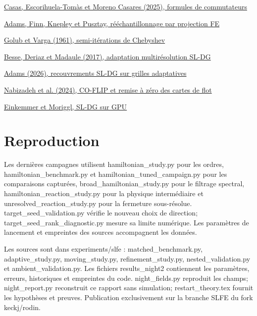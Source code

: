 \documentclass[10pt,a4paper]{article}
\begin{document}
\noindent\href{https://doi.org/10.1007/s11128-025-04659-z}{Casas, Escorihuela-Tomàs et Moreno Casares (2025), formules de commutateurs}\par
\noindent\href{https://arxiv.org/abs/2501.13681}{Adams, Finn, Knepley et Pusztay, rééchantillonnage par projection FE}\par
\noindent\href{https://gdz.sub.uni-goettingen.de/download/pdf/PPN362160546_0003/PPN362160546_0003.pdf}{Golub et Varga (1961), semi-itérations de Chebyshev}\par
\noindent\href{https://www.oca.eu/images/LAGRANGE/pages_perso/nbesse/pub/NBesse_jcp17.pdf}{Besse, Deriaz et Madaule (2017), adaptation multirésolution SL-DG}\par
\noindent\href{https://arxiv.org/abs/2603.19959}{Adams (2026), recouvrements SL-DG sur grilles adaptatives}\par
\noindent\href{https://cseweb.ucsd.edu/~ravir/sinasiga.pdf}{Nabizadeh et al. (2024), CO-FLIP et remise à zéro des cartes de flot}\par
\noindent\href{https://arxiv.org/abs/2212.03036}{Einkemmer et Moriggl, SL-DG sur GPU}\par
\section{Reproduction}
Les dernières campagnes utilisent hamiltonian\_study.py pour les ordres, hamiltonian\_benchmark.py et hamiltonian\_tuned\_campaign.py pour les comparaisons capturées, broad\_hamiltonian\_study.py pour le filtrage spectral, hamiltonian\_reaction\_study.py pour la physique intermédiaire et unresolved\_reaction\_study.py pour la fermeture sous-résolue. target\_seed\_validation.py vérifie le nouveau choix de direction; target\_seed\_rank\_diagnostic.py mesure sa limite numérique. Les paramètres de lancement et empreintes des sources accompagnent les données.

Les sources sont dans experiments/slfe : matched\_benchmark.py, adaptive\_study.py, moving\_study.py, refinement\_study.py, nested\_validation.py et ambient\_validation.py. Les fichiers results\_night2 contiennent les paramètres, erreurs, historiques et empreintes du code. night\_fields.py reproduit les champs; night\_report.py reconstruit ce rapport sans simulation; restart\_theory.tex fournit les hypothèses et preuves. Publication exclusivement sur la branche SLFE du fork keckj/rodin.
\end{document}
